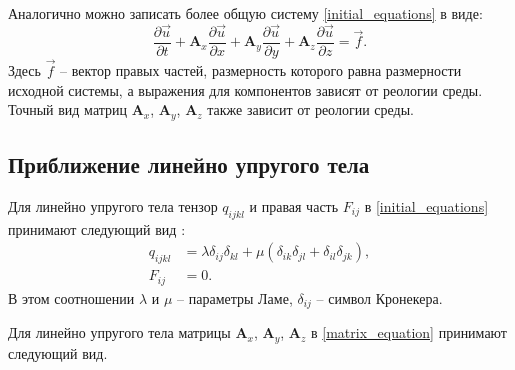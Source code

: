 Аналогично можно записать более общую систему \ref{initial_equations} в виде:
\begin{equation}
\label{matrix_equation}
\frac{\partial\vec{u}}{\partial{t}}+\mathbf{A}_x\frac{\partial\vec{u}}{\partial{x}}+
\mathbf{A}_y\frac{\partial\vec{u}}{\partial{y}}+
\mathbf{A}_z\frac{\partial\vec{u}}{\partial{z}}=\vec{f}.
\end{equation}
Здесь $\vec{f}$ -- вектор правых частей, размерность которого равна размерности исходной системы, а выражения для компонентов зависят от реологии среды. Точный вид матриц $\mathbf{A}_x$, $\mathbf{A}_y$, $\mathbf{A}_z$ также зависит от реологии среды.

\clearpage
\newpage

\subsection{Приближение линейно упругого тела}
\label{elastic_matrixes}

Для линейно упругого тела тензор $q_{ijkl}$ и правая часть $F_{ij}$ в \ref{initial_equations} принимают следующий вид \cite{landau_lifshits}:
\begin{align}
\label{tensor_qijkl_elastic}
q_{ijkl}&=\lambda\delta_{ij}\delta_{kl}+\mu(\delta_{ik}\delta_{jl}+\delta_{il}
\delta_{jk}),\nonumber\\
F_{ij}&=0.
\end{align}
В этом соотношении $\lambda$ и $\mu$ -- параметры Ламе, $\delta_{ij}$ -- символ Кронекера.

Для линейно упругого тела матрицы $\mathbf{A}_x$, $\mathbf{A}_y$, $\mathbf{A}_z$ в \ref{matrix_equation} принимают следующий вид.

